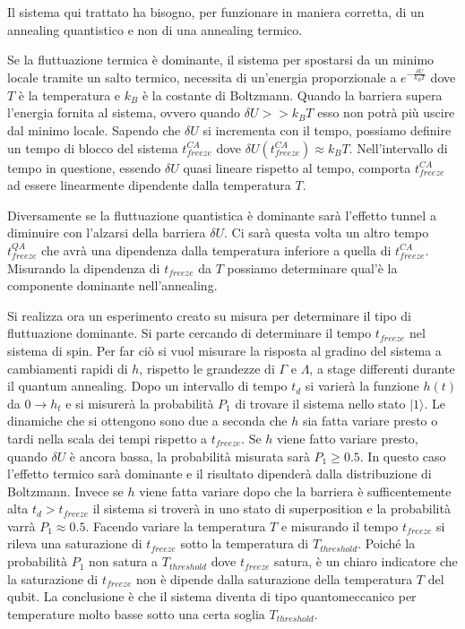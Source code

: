 \cite{QAS}Il sistema qui trattato ha bisogno, per funzionare in maniera corretta, di un annealing quantistico e non di una annealing termico.

Se la fluttuazione termica è dominante, il sistema per spostarsi da un minimo locale tramite un salto termico, necessita di un'energia proporzionale a $e^{-\frac{\delta U}{k_B T}}$ dove $T$ è la temperatura e $k_B$ è la costante di Boltzmann.
Quando la barriera supera l'energia fornita al sistema, ovvero quando $\delta U >> k_B T$ esso non potrà più uscire dal minimo locale. Sapendo che $\delta U$ si incrementa con il tempo, possiamo definire un tempo di blocco del sistema $t_{freeze}^{CA}$ dove $\delta U(t_{freeze}^{CA}) \approx k_BT$. Nell'intervallo di tempo in questione, essendo $\delta U$ quasi lineare rispetto al tempo, comporta $t_{freeze}^{CA}$ ad essere linearmente dipendente dalla temperatura $T$.

Diversamente se la fluttuazione quantistica è dominante sarà l'effetto tunnel a diminuire con l'alzarsi della barriera $\delta U$. Ci sarà questa volta un altro tempo $t_{freeze}^{QA}$ che avrà una dipendenza dalla temperatura inferiore a quella di $t_{freeze}^{CA}$. Misurando la dipendenza di $t_{freeze}$ da $T$ possiamo determinare qual'è la componente dominante nell'annealing.

Si realizza ora un esperimento creato su misura per determinare il tipo di fluttuazione dominante. Si parte cercando di determinare il tempo $t_{freeze}$ nel sistema di spin. Per far ciò si vuol misurare la risposta al gradino del sistema a cambiamenti rapidi di $h$, rispetto le grandezze di $\Gamma$ e $\Lambda$, a stage differenti durante il quantum annealing. Dopo un intervallo di tempo $t_d$ si varierà la funzione $h(t)$ da $0 \to h_t$ e si misurerà la probabilità $P_1$ di trovare il sistema nello stato $|1\rangle$. Le dinamiche che si ottengono sono due a seconda che $h$ sia fatta variare presto o tardi nella scala dei tempi rispetto a $t_{freeze}$. Se $h$ viene fatto variare presto, quando $\delta U$ è ancora bassa, la probabilità misurata sarà $P_1 \ge 0.5$. In questo caso l'effetto termico sarà dominante e il risultato dipenderà dalla distribuzione di Boltzmann. Invece se $h$ viene fatta variare dopo che la barriera è sufficentemente alta $t_d > t_{freeze}$ il sistema si troverà in uno stato di superposition e la probabilità varrà $P_1 \approx 0.5$.
Facendo variare la temperatura $T$ e misurando il tempo $t_{freeze}$ si rileva una saturazione di $t_{freeze}$ sotto la temperatura di $T_{threshold}$. Poiché la probabilità $P_1$ non satura a $T_{threshold}$ dove $t_{freeze}$ satura, è un chiaro indicatore che la saturazione di $t_{freeze}$ non è dipende dalla saturazione della temperatura $T$ del qubit. La conclusione è che il sistema diventa di tipo quantomeccanico per temperature molto basse sotto una certa soglia $T_{threshold}$.
